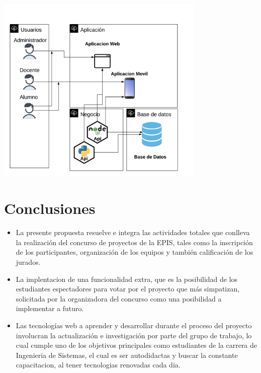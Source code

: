 \documentclass[%
 reprint,
 amsmath,amssymb,
 aps,
]{revtex4-1}
\begin{document}
\begin{center}
\includegraphics[width=10cm]{./Imagenes/arquitectura2}
\end{center}

\section{Conclusiones}

\begin{itemize}
\item La presente propuesta resuelve e integra las actividades totales que conlleva la realización del concurso de proyectos de la EPIS, tales como la inscripción de los participantes, organización de los equipos y también calificación de los jurados. 

\item La implentacion de una funcionalidad extra, que es la posibilidad de los estudiantes espectadores  para votar por el proyecto que más simpatizan,  solicitada por la organizadora del concurso como una posibilidad a implementar a futuro. 

\item Las tecnologías web a aprender y desarrollar durante el proceso del proyecto involucran la actualización e investigación por parte del grupo de trabajo, lo cual cumple uno de los objetivos principales como estudiantes de la carrera de Ingenieria de Sistemas, el cual es ser autodidactas y buscar la constante capacitacion, al tener tecnologias renovadas cada dia.
 

\end{itemize}


%
%
\end{document}
